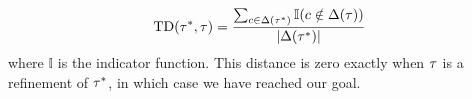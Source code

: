 



\begin{align}
    \mathrm{TD}(\tau^*, \tau) = \frac{\sum_{c \in \Delta(\tau^*)} \mathbb{I}(c \notin \Delta(\tau)) }{|\Delta(\tau^*)|}
\end{align}
where $\mathbb{I}$ is the indicator function.
This distance is zero exactly when $\tau$ is a refinement of $\tau^*$, in which case we have reached our goal. 




